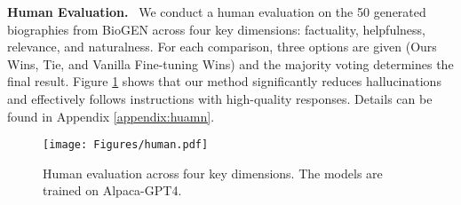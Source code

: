 \noindent
\textbf{Human Evaluation.}
\
We conduct a human evaluation on the 50 generated biographies from BioGEN across four key dimensions: factuality, helpfulness, relevance, and naturalness.
For each comparison, three options are given (Ours Wins, Tie, and Vanilla Fine-tuning Wins) and the majority voting determines the final result. 
Figure \ref{fig_human} shows that our method significantly reduces hallucinations and effectively follows instructions with high-quality responses.
Details can be found in Appendix \ref{appendix:huamn}.

\begin{figure}
    \centering
    \texttt{[image: Figures/human.pdf]}
    \caption{Human evaluation across four key dimensions. The models are trained on Alpaca-GPT4.}
    \label{fig_human}
\end{figure}
